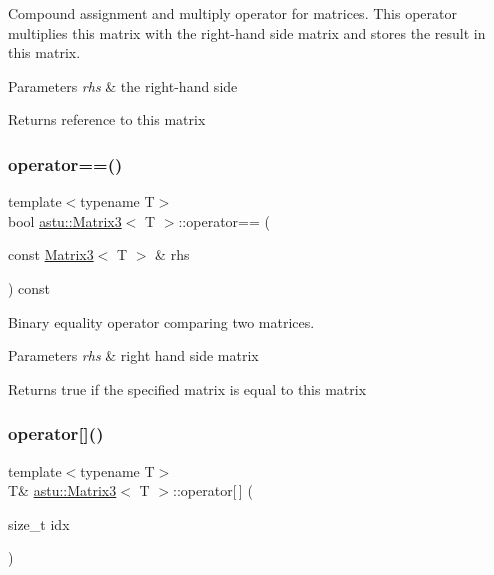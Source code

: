 Compound assignment and multiply operator for matrices. This operator multiplies this matrix with the right-\/hand side matrix and stores the result in this matrix.


\begin{DoxyParams}{Parameters}
{\em rhs} & the right-\/hand side \\
\hline
\end{DoxyParams}
\begin{DoxyReturn}{Returns}
reference to this matrix 
\end{DoxyReturn}
\mbox{\label{classastu_1_1Matrix3_a45bc188bb2d2580b6a379e209cd92303}} 
\subsubsection{\texorpdfstring{operator==()}{operator==()}}
{\footnotesize\ttfamily template$<$typename T$>$ \\
bool \hyperlink{classastu_1_1Matrix3}{astu\+::\+Matrix3}$<$ T $>$\+::operator== (\begin{DoxyParamCaption}\item[{const \hyperlink{classastu_1_1Matrix3}{Matrix3}$<$ T $>$ \&}]{rhs }\end{DoxyParamCaption}) const\hspace{0.3cm}{\ttfamily [inline]}}

Binary equality operator comparing two matrices.


\begin{DoxyParams}{Parameters}
{\em rhs} & right hand side matrix \\
\hline
\end{DoxyParams}
\begin{DoxyReturn}{Returns}
{\ttfamily true} if the specified matrix is equal to this matrix 
\end{DoxyReturn}
\mbox{\label{classastu_1_1Matrix3_ac9516bdeb2c41154a7014664061e507d}} 
\subsubsection{\texorpdfstring{operator[]()}{operator[]()}\hspace{0.1cm}{\footnotesize\ttfamily [1/2]}}
{\footnotesize\ttfamily template$<$typename T$>$ \\
T\& \hyperlink{classastu_1_1Matrix3}{astu\+::\+Matrix3}$<$ T $>$\+::operator\mbox{[}$\,$\mbox{]} (\begin{DoxyParamCaption}\item[{size\+\_\+t}]{idx }\end{DoxyParamCaption})\hspace{0.3cm}{\ttfamily [inline]}}


